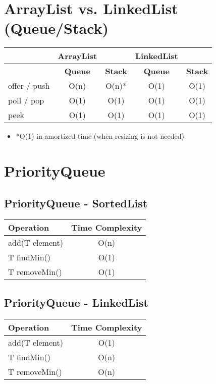 \documentclass{article}
\begin{document}
\section{ArrayList vs. LinkedList (Queue/Stack)}
\begin{table}[h!]
\centering
\begin{tabular}{|l|c|c|c|c|}
\hline
& \textbf{ArrayList} & & \textbf{LinkedList} & \\
\hline
& \textbf{Queue} & \textbf{Stack} & \textbf{Queue} & \textbf{Stack} \\
\hline
offer / push & O(n) & O(n)* & O(1) & O(1) \\
\hline
poll / pop & O(1) & O(1) & O(1) & O(1) \\
\hline
peek & O(1) & O(1) & O(1) & O(1) \\
\hline
\end{tabular}
\end{table}
\begin{itemize}
  \item *O(1) in amortized time (when resizing is not needed)
\end{itemize}

\section{PriorityQueue}
\subsection{PriorityQueue - SortedList}
\begin{table}[h!]
\centering
\begin{tabular}{|l|c|}
\hline
\textbf{Operation} & \textbf{Time Complexity} \\
\hline
add(T element) & O(n) \\
\hline
T findMin() & O(1) \\
\hline
T removeMin() & O(1) \\
\hline
\end{tabular}
\end{table}
\subsection{PriorityQueue - LinkedList}
\begin{table}[h!]
\centering
\begin{tabular}{|l|c|}
\hline
\textbf{Operation} & \textbf{Time Complexity} \\
\hline
add(T element) & O(1) \\
\hline
T findMin() & O(n) \\
\hline
T removeMin() & O(n) \\
\hline
\end{tabular}
\end{table}
\end{document}
